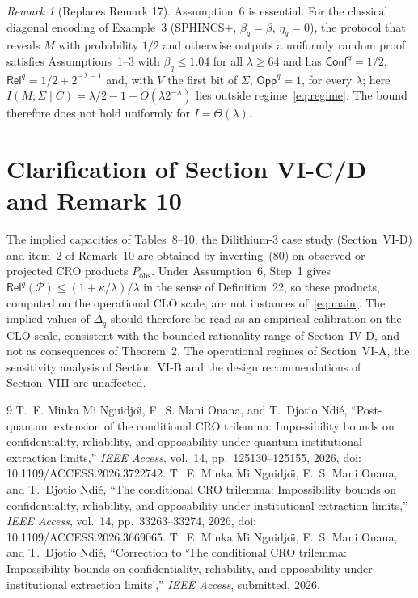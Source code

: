 \documentclass[10pt,a4paper]{article}
\theoremstyle{remark}
\newtheorem*{remark}{Remark}
\newcommand{\Confq}{\mathsf{Conf}^q}
\newcommand{\Relq}{\mathsf{Rel}^q}
\newcommand{\Oppq}{\mathsf{Opp}^q}
\newcommand{\cP}{\mathcal{P}}
\newcommand{\IMS}{I(M;\Sigma\mid C)}
\begin{document}
\begin{remark}[Replaces Remark 17]
Assumption~6 is essential. For the classical diagonal encoding of
Example~3 (SPHINCS+, $\beta_q=\beta$, $\eta_q=0$), the protocol that reveals
$M$ with probability $1/2$ and otherwise outputs a uniformly random proof
satisfies Assumptions~1--3 with $\beta_q\le1.04$ for all $\lambda\ge64$ and
has $\Confq=1/2$, $\Relq=1/2+2^{-\lambda-1}$ and, with $V$ the first bit of
$\Sigma$, $\Oppq=1$, for every $\lambda$; here
$\IMS=\lambda/2-1+O(\lambda2^{-\lambda})$ lies outside
regime~\eqref{eq:regime}. The bound therefore does not hold uniformly for
$I=\Theta(\lambda)$.
\end{remark}

\section{Clarification of Section VI-C/D and Remark 10}

The implied capacities of Tables~8--10, the Dilithium-3 case study
(Section~VI-D) and item~2 of Remark~10 are obtained by inverting~(80) on
observed or projected CRO products $P_{\mathrm{obs}}$. Under Assumption~6,
Step~1 gives $\Relq(\cP)\le(1+\kappa/\lambda)/\lambda$ in the sense of
Definition~22, so these products, computed on the operational CLO scale,
are not instances of~\eqref{eq:main}. The implied values of $\Delta_q$
should therefore be read as an empirical calibration on the CLO scale,
consistent with the bounded-rationality range of Section~IV-D, and not as
consequences of Theorem~2. The operational regimes of Section~VI-A, the
sensitivity analysis of Section~VI-B and the design recommendations of
Section~VIII are unaffected.

\begin{thebibliography}{9}
T.~E. Minka Mi Nguidjo\"{\i}, F.~S. Mani Onana, and T.~Djotio Ndi\'e,
``Post-quantum extension of the conditional CRO trilemma: Impossibility
bounds on confidentiality, reliability, and opposability under quantum
institutional extraction limits,'' \emph{IEEE Access}, vol.~14,
pp.~125130--125155, 2026, doi: 10.1109/ACCESS.2026.3722742.
T.~E. Minka Mi Nguidjo\"{\i}, F.~S. Mani Onana, and T.~Djotio Ndi\'e,
``The conditional CRO trilemma: Impossibility bounds on confidentiality,
reliability, and opposability under institutional extraction limits,''
\emph{IEEE Access}, vol.~14, pp.~33263--33274, 2026,
doi: 10.1109/ACCESS.2026.3669065.
T.~E. Minka Mi Nguidjo\"{\i}, F.~S. Mani Onana, and T.~Djotio Ndi\'e,
``Correction to `The conditional CRO trilemma: Impossibility bounds on
confidentiality, reliability, and opposability under institutional
extraction limits','' \emph{IEEE Access}, submitted, 2026.
\end{thebibliography}
\end{document}
